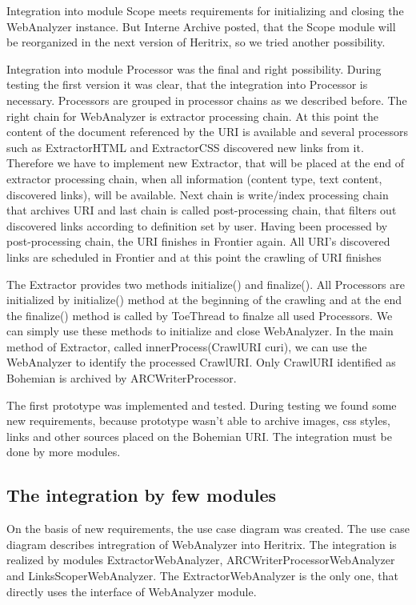 \documentclass[11pt,a4paper]{article}
\begin{document}
Integration into module Scope meets requirements for initializing and closing the WebAnalyzer instance. But Interne Archive posted, that the Scope module will be reorganized in the next version of Heritrix, so we tried another possibility.

Integration into module Processor was the final and right possibility. During testing the first version it was clear, that the integration into Processor is necessary. Processors are grouped in processor chains as we described before. The right chain for WebAnalyzer is extractor processing chain. At this point the content of the document referenced by the URI is available and several processors such as ExtractorHTML and ExtractorCSS discovered new links from it. Therefore we have to implement new Extractor, that will be placed at the end of extractor processing chain, when all information (content type, text content, discovered links), will be available. Next chain is write/index processing chain that archives URI and last chain is called post-processing chain, that filters out discovered links according to definition set by user. Having been processed by post-processing chain, the URI finishes in Frontier again. All URI's discovered links are scheduled in Frontier and at this point the crawling of URI finishes

The Extractor provides two methods initialize() and finalize(). All Processors are initialized by initialize() method at the beginning of the crawling and at the end the finalize() method is called by ToeThread to finalze all used Processors. We can simply use these methods to initialize and close WebAnalyzer. In the main method of Extractor, called innerProcess(CrawlURI curi), we can use the WebAnalyzer to identify the processed CrawlURI. Only CrawlURI identified as Bohemian is archived by ARCWriterProcessor.

The first prototype was implemented and tested. During testing we found some new requirements, because prototype wasn't able to archive images, css styles, links and other sources placed on the Bohemian URI. The integration must be done by more modules.

\subsection{The integration by few modules}
On the basis of new requirements, the use case diagram was created. The use case diagram describes intregration of WebAnalyzer into Heritrix. The integration is realized by modules ExtractorWebAnalyzer, ARCWriterProcessorWebAnalyzer and LinksScoperWebAnalyzer. The ExtractorWebAnalyzer is the only one, that directly uses the interface of WebAnalyzer module.
\end{document}
